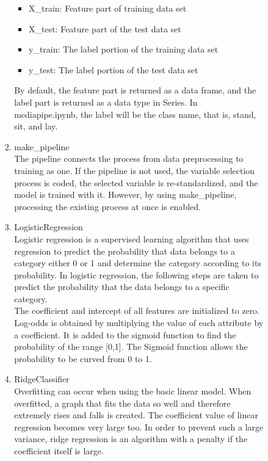 \documentclass[conference]{IEEEtran}
\begin{document}
\begin{enumerate}[label=\arabic*.]
\begin{enumerate}[label=\arabic*.]
\begin{enumerate}[label=\alph*.]
\begin{enumerate}[label=\roman*.]
            \begin{itemize}
                \item X\_train: Feature part of training data set
                \item X\_test: Feature part of the test data set
                \item y\_train: The label portion of the training data set
                \item y\_test: The label portion of the test data set \\
            \end{itemize}
            By default, the feature part is returned as a data frame, and the label part is returned as a data type in Series. In mediapipe.ipynb, the label will be the class name, that is, stand, sit, and lay. \\
            \item{\large{make\_pipeline}}\\ 
            The pipeline connects the process from data preprocessing to training as one. If the pipeline is not used, the variable selection process is coded, the selected variable is re-standardized, and the model is trained with it. However, by using make\_pipeline, processing the existing process at once is enabled. \\
            \item{\large{LogisticRegression}}\\ 
            Logistic regression is a supervised learning algorithm that uses regression to predict the probability that data belongs to a category either 0 or 1 and determine the category according to its probability. In logistic regression, the following steps are taken to predict the probability that the data belongs to a specific category. \\
            The coefficient and intercept of all features are initialized to zero. Log-odds is obtained by multiplying the value of each attribute by a coefficient. It is added to the sigmoid function to find the probability of the range [0,1]. The Sigmoid function allows the probability to be curved from 0 to 1. \\
            \item{\large{RidgeClassifier}}\\ 
            Overfitting can occur when using the basic linear model. When overfitted, a graph that fits the data so well and therefore extremely rises and falls is created. The coefficient value of linear regression becomes very large too. In order to prevent such a large variance, ridge regression is an algorithm with a penalty if the coefficient itself is large. \\

\end{enumerate}
\end{enumerate}
\end{enumerate}
\end{enumerate}
\end{document}
